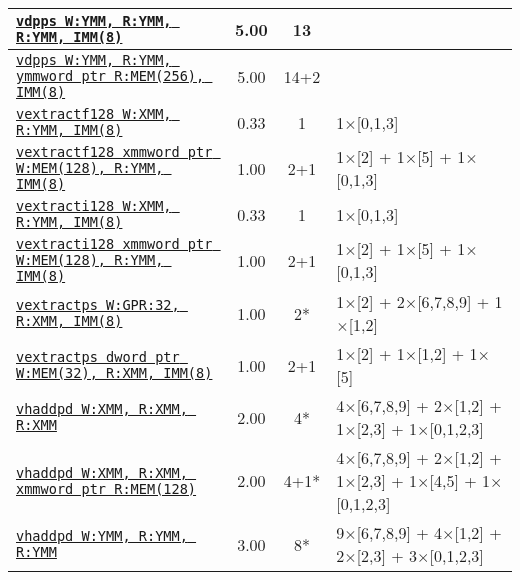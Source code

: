 \documentclass[a4paper,english,fontsize=9]{scrartcl}
\begin{document}
\begin{longtable}{p{}ccL{.25\textwidth}}
  \midrule
  \texttt{\href{https://felixcloutier.com/x86/DPPS.html}{vdpps W:YMM, R:YMM, R:YMM, IMM(8)}} & 5.00 & 13 &  \\
  \midrule
  \texttt{\href{https://felixcloutier.com/x86/DPPS.html}{vdpps W:YMM, R:YMM, ymmword ptr R:MEM(256), IMM(8)}} & 5.00 & 14+2 &  \\
  \midrule
  \texttt{\href{https://felixcloutier.com/x86/VEXTRACTF128:VEXTRACTF32x4:VEXTRACTF64x2:VEXTRACTF32x8:VEXTRACTF64x4.html}{vextractf128 W:XMM, R:YMM, IMM(8)}} & 0.33 & 1 & 1\(\times\)[0,1,3] \\
  \midrule
  \texttt{\href{https://felixcloutier.com/x86/VEXTRACTF128:VEXTRACTF32x4:VEXTRACTF64x2:VEXTRACTF32x8:VEXTRACTF64x4.html}{vextractf128 xmmword ptr W:MEM(128), R:YMM, IMM(8)}} & 1.00 & 2+1 & 1\(\times\)[2] + 1\(\times\)[5] + 1\(\times\)[0,1,3] \\
  \midrule
  \texttt{\href{https://felixcloutier.com/x86/VEXTRACTI128:VEXTRACTI32x4:VEXTRACTI64x2:VEXTRACTI32x8:VEXTRACTI64x4.html}{vextracti128 W:XMM, R:YMM, IMM(8)}} & 0.33 & 1 & 1\(\times\)[0,1,3] \\
  \midrule
  \texttt{\href{https://felixcloutier.com/x86/VEXTRACTI128:VEXTRACTI32x4:VEXTRACTI64x2:VEXTRACTI32x8:VEXTRACTI64x4.html}{vextracti128 xmmword ptr W:MEM(128), R:YMM, IMM(8)}} & 1.00 & 2+1 & 1\(\times\)[2] + 1\(\times\)[5] + 1\(\times\)[0,1,3] \\
  \midrule
  \texttt{\href{https://felixcloutier.com/x86/EXTRACTPS.html}{vextractps W:GPR:32, R:XMM, IMM(8)}} & 1.00 & 2* & 1\(\times\)[2] + 2\(\times\)[6,7,8,9] + 1\(\times\)[1,2] \\
  \midrule
  \texttt{\href{https://felixcloutier.com/x86/EXTRACTPS.html}{vextractps dword ptr W:MEM(32), R:XMM, IMM(8)}} & 1.00 & 2+1 & 1\(\times\)[2] + 1\(\times\)[1,2] + 1\(\times\)[5] \\
  \midrule
  \texttt{\href{https://felixcloutier.com/x86/HADDPD.html}{vhaddpd W:XMM, R:XMM, R:XMM}} & 2.00 & 4* & 4\(\times\)[6,7,8,9] + 2\(\times\)[1,2] + 1\(\times\)[2,3] + 1\(\times\)[0,1,2,3] \\
  \midrule
  \texttt{\href{https://felixcloutier.com/x86/HADDPD.html}{vhaddpd W:XMM, R:XMM, xmmword ptr R:MEM(128)}} & 2.00 & 4+1* & 4\(\times\)[6,7,8,9] + 2\(\times\)[1,2] + 1\(\times\)[2,3] + 1\(\times\)[4,5] + 1\(\times\)[0,1,2,3] \\
  \midrule
  \texttt{\href{https://felixcloutier.com/x86/HADDPD.html}{vhaddpd W:YMM, R:YMM, R:YMM}} & 3.00 & 8* & 9\(\times\)[6,7,8,9] + 4\(\times\)[1,2] + 2\(\times\)[2,3] + 3\(\times\)[0,1,2,3] \\

\end{longtable}
\end{document}
